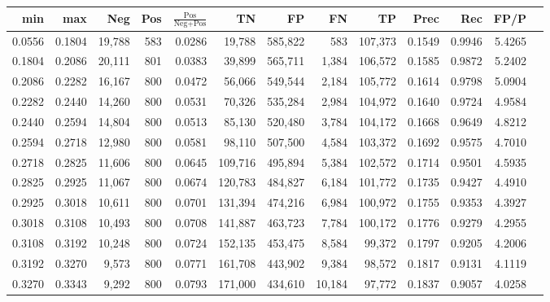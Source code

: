 \begin{tabular}{rrrrrrrrrrrrr}
\toprule
   min &    max &    Neg & Pos & $\frac{\text{Pos}}{\text{Neg}+\text{Pos}}$ &      TN &      FP &      FN &      TP &   Prec &    Rec &   FP/P \\
\midrule
0.0556 & 0.1804 & 19,788 & 583 &                                     0.0286 &  19,788 & 585,822 &     583 & 107,373 & 0.1549 & 0.9946 & 5.4265 \\
0.1804 & 0.2086 & 20,111 & 801 &                                     0.0383 &  39,899 & 565,711 &   1,384 & 106,572 & 0.1585 & 0.9872 & 5.2402 \\
0.2086 & 0.2282 & 16,167 & 800 &                                     0.0472 &  56,066 & 549,544 &   2,184 & 105,772 & 0.1614 & 0.9798 & 5.0904 \\
0.2282 & 0.2440 & 14,260 & 800 &                                     0.0531 &  70,326 & 535,284 &   2,984 & 104,972 & 0.1640 & 0.9724 & 4.9584 \\
0.2440 & 0.2594 & 14,804 & 800 &                                     0.0513 &  85,130 & 520,480 &   3,784 & 104,172 & 0.1668 & 0.9649 & 4.8212 \\
0.2594 & 0.2718 & 12,980 & 800 &                                     0.0581 &  98,110 & 507,500 &   4,584 & 103,372 & 0.1692 & 0.9575 & 4.7010 \\
0.2718 & 0.2825 & 11,606 & 800 &                                     0.0645 & 109,716 & 495,894 &   5,384 & 102,572 & 0.1714 & 0.9501 & 4.5935 \\
0.2825 & 0.2925 & 11,067 & 800 &                                     0.0674 & 120,783 & 484,827 &   6,184 & 101,772 & 0.1735 & 0.9427 & 4.4910 \\
0.2925 & 0.3018 & 10,611 & 800 &                                     0.0701 & 131,394 & 474,216 &   6,984 & 100,972 & 0.1755 & 0.9353 & 4.3927 \\
0.3018 & 0.3108 & 10,493 & 800 &                                     0.0708 & 141,887 & 463,723 &   7,784 & 100,172 & 0.1776 & 0.9279 & 4.2955 \\
0.3108 & 0.3192 & 10,248 & 800 &                                     0.0724 & 152,135 & 453,475 &   8,584 &  99,372 & 0.1797 & 0.9205 & 4.2006 \\
0.3192 & 0.3270 &  9,573 & 800 &                                     0.0771 & 161,708 & 443,902 &   9,384 &  98,572 & 0.1817 & 0.9131 & 4.1119 \\
0.3270 & 0.3343 &  9,292 & 800 &                                     0.0793 & 171,000 & 434,610 &  10,184 &  97,772 & 0.1837 & 0.9057 & 4.0258 \\

\end{tabular}
